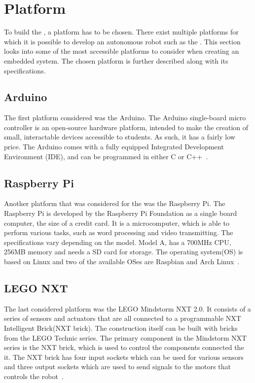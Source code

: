 \section{Platform} \label{sec:platform}
To build the \projname{}, a platform has to be chosen. There exist multiple platforms for which it is possible to develop an autonomous robot such as the \projname{}. This section looks into some of the most accessible platforms to consider when creating an embedded system. The chosen platform is further described along with its specifications.

\subsection{Arduino}
The first platform considered was the Arduino. The Arduino single-board micro controller is an open-source hardware platform, intended to make the creation of small, interactable devices accessible to students. As such, it has a fairly low price. The Arduino comes with a fully equipped Integrated Development Environment (IDE), and can be programmed in either C or C++~\citep{arduino}.

\subsection{Raspberry Pi}
Another platform that was considered for the \projname{} was the Raspberry Pi. The Raspberry Pi is developed by the Raspberry Pi Foundation as a single board computer, the size of a credit card. It is a microcomputer, which is able to perform various tasks, such as word processing and video transmitting. The specifications vary depending on the model. Model A, has a 700MHz CPU, 256MB memory and needs a SD card for storage. The operating system(OS) is based on Linux and two of the available OSes are Raspbian and Arch Linux~\citep{raspberry_pi}. 

\subsection{LEGO NXT} \label{sec:lego_nxt} 
The last considered platform was the LEGO Mindstorm NXT 2.0. It consists of a series of sensors and actuators that are all connected to a programmable NXT Intelligent Brick(NXT brick). The construction itself can be built with bricks from the LEGO Technic series. The primary component in the Mindstorm NXT series is the NXT brick, which is used to control the components connected the it. The NXT brick has four input sockets which can be used for various sensors and three output sockets which are used to send signals to the motors that controls the robot~\citep{lego_nxt_2.0}.

